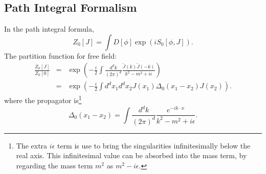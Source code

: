 \subsection{Path Integral Formalism}
In the path integral formula,
\begin{equation}
Z_0[J] = \int D[\phi] \exp(iS_0[\phi,J]).
\end{equation}
The partition function for free field:
\begin{eqnarray*}
	\frac{Z_0[J]}{Z_0[0]}
	&=& \exp\left(-\frac{i}{2}\int \frac{d^dk}{(2\pi)^d} \frac{\tilde J(k) \tilde J(-k)}{k^2-m^2+i\epsilon} \right) \\
	&=& \exp\left(-\frac{i}{2}\int d^dx_1 d^dx_2 J(x_1)\Delta_0(x_1-x_2)J(x_2)\right).
\end{eqnarray*}
where the propagator is\footnote{The extra $i\epsilon$ term is use to bring the singularities infinitesimally below the real axis. This infinitesimal value can be absorbed into the mass term, by regarding the mass term $m^2$ as $m^2-i\epsilon$.}
\begin{equation}
	\Delta_0(x_1-x_2) = \int \frac{d^dk}{(2\pi)^d} \frac{e^{-ik\cdot x}}{k^2-m^2+i\epsilon}.
\end{equation}

